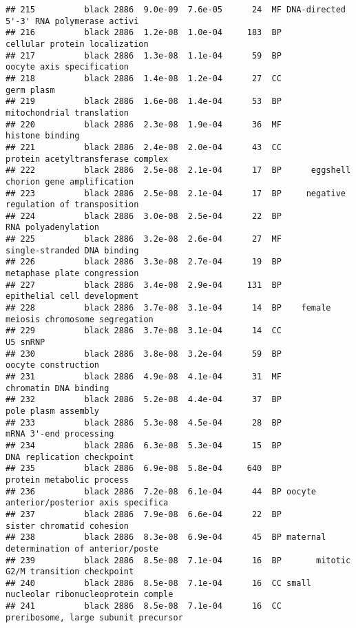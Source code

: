 \documentclass[]{article}
\begin{document}
\begin{verbatim}
## 215          black 2886  9.0e-09  7.6e-05      24  MF DNA-directed 5'-3' RNA polymerase activi
## 216          black 2886  1.2e-08  1.0e-04     183  BP            cellular protein localization
## 217          black 2886  1.3e-08  1.1e-04      59  BP                oocyte axis specification
## 218          black 2886  1.4e-08  1.2e-04      27  CC                               germ plasm
## 219          black 2886  1.6e-08  1.4e-04      53  BP                mitochondrial translation
## 220          black 2886  2.3e-08  1.9e-04      36  MF                          histone binding
## 221          black 2886  2.4e-08  2.0e-04      43  CC        protein acetyltransferase complex
## 222          black 2886  2.5e-08  2.1e-04      17  BP      eggshell chorion gene amplification
## 223          black 2886  2.5e-08  2.1e-04      17  BP     negative regulation of transposition
## 224          black 2886  3.0e-08  2.5e-04      22  BP                      RNA polyadenylation
## 225          black 2886  3.2e-08  2.6e-04      27  MF              single-stranded DNA binding
## 226          black 2886  3.3e-08  2.7e-04      19  BP              metaphase plate congression
## 227          black 2886  3.4e-08  2.9e-04     131  BP              epithelial cell development
## 228          black 2886  3.7e-08  3.1e-04      14  BP    female meiosis chromosome segregation
## 229          black 2886  3.7e-08  3.1e-04      14  CC                                 U5 snRNP
## 230          black 2886  3.8e-08  3.2e-04      59  BP                      oocyte construction
## 231          black 2886  4.9e-08  4.1e-04      31  MF                    chromatin DNA binding
## 232          black 2886  5.2e-08  4.4e-04      37  BP                      pole plasm assembly
## 233          black 2886  5.3e-08  4.5e-04      28  BP                   mRNA 3'-end processing
## 234          black 2886  6.3e-08  5.3e-04      15  BP               DNA replication checkpoint
## 235          black 2886  6.9e-08  5.8e-04     640  BP                protein metabolic process
## 236          black 2886  7.2e-08  6.1e-04      44  BP oocyte anterior/posterior axis specifica
## 237          black 2886  7.9e-08  6.6e-04      22  BP                sister chromatid cohesion
## 238          black 2886  8.3e-08  6.9e-04      45  BP maternal determination of anterior/poste
## 239          black 2886  8.5e-08  7.1e-04      16  BP       mitotic G2/M transition checkpoint
## 240          black 2886  8.5e-08  7.1e-04      16  CC small nucleolar ribonucleoprotein comple
## 241          black 2886  8.5e-08  7.1e-04      16  CC     preribosome, large subunit precursor

\end{verbatim}
\end{document}
